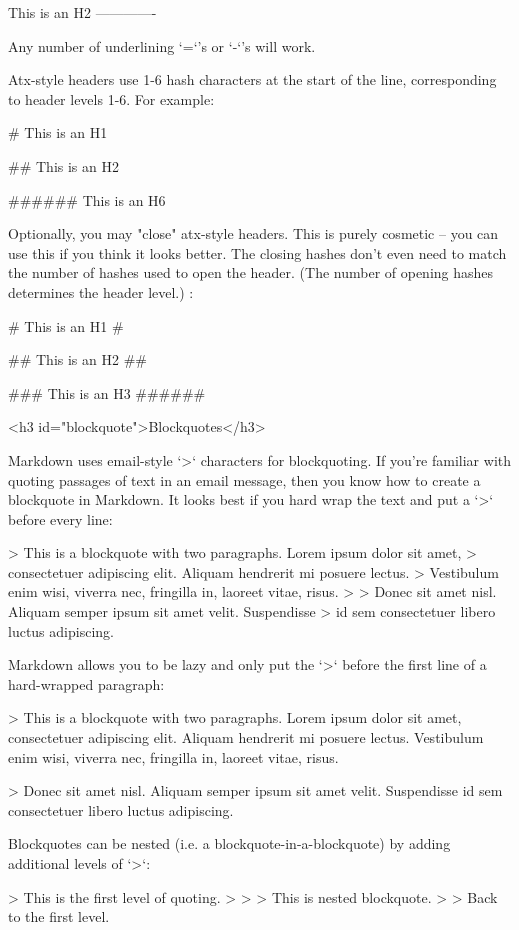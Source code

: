     This is an H2
    -------------

Any number of underlining `=`'s or `-`'s will work.

Atx-style headers use 1-6 hash characters at the start of the line, corresponding to header levels 1-6. For example:

    # This is an H1

    ## This is an H2

    ###### This is an H6

Optionally, you may "close" atx-style headers. This is purely cosmetic -- you can use this if you think it looks better. The closing hashes don't even need to match the number of hashes used to open the header. (The number of opening hashes determines the header level.) :

    # This is an H1 #

    ## This is an H2 ##

    ### This is an H3 ######


<h3 id="blockquote">Blockquotes</h3>

Markdown uses email-style `>` characters for blockquoting. If you're familiar with quoting passages of text in an email message, then you know how to create a blockquote in Markdown. It looks best if you hard wrap the text and put a `>` before every line:

    > This is a blockquote with two paragraphs. Lorem ipsum dolor sit amet,
    > consectetuer adipiscing elit. Aliquam hendrerit mi posuere lectus.
    > Vestibulum enim wisi, viverra nec, fringilla in, laoreet vitae, risus.
    > 
    > Donec sit amet nisl. Aliquam semper ipsum sit amet velit. Suspendisse
    > id sem consectetuer libero luctus adipiscing.

Markdown allows you to be lazy and only put the `>` before the first line of a hard-wrapped paragraph:

    > This is a blockquote with two paragraphs. Lorem ipsum dolor sit amet,
    consectetuer adipiscing elit. Aliquam hendrerit mi posuere lectus.
    Vestibulum enim wisi, viverra nec, fringilla in, laoreet vitae, risus.

    > Donec sit amet nisl. Aliquam semper ipsum sit amet velit. Suspendisse
    id sem consectetuer libero luctus adipiscing.

Blockquotes can be nested (i.e. a blockquote-in-a-blockquote) by adding additional levels of `>`:

    > This is the first level of quoting.
    >
    > > This is nested blockquote.
    >
    > Back to the first level.

